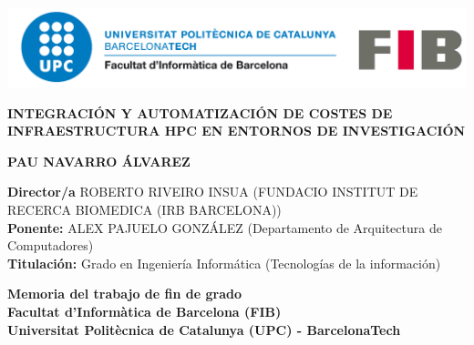 \begin{titlepage}
\begin{center}
    \includegraphics[width=1\linewidth]{extra/figures/logo-upc-fib.png}
    \vspace{30mm}

    \LARGE{\textsc{\textbf{{INTEGRACIÓN Y AUTOMATIZACIÓN DE COSTES DE INFRAESTRUCTURA HPC EN ENTORNOS DE INVESTIGACIÓN}}}} \\
    \vspace{25mm}
      
        
    \textbf{\Large{\textsc{PAU NAVARRO ÁLVAREZ}}} \\
    \vspace{25mm}
        
    
    
    \large{\textbf{Director/a} ROBERTO RIVEIRO INSUA (FUNDACIO INSTITUT DE RECERCA BIOMEDICA (IRB BARCELONA))} \\
    \large{\textbf{Ponente:} ALEX PAJUELO GONZÁLEZ (Departamento de Arquitectura de Computadores)} \\
    \large{\textbf{Titulación:} Grado en Ingeniería Informática (Tecnologías de la información)} \\
    \vspace{8mm}

    \textbf{\large{Memoria del trabajo de fin de grado}} \\
    \vspace{3mm}
    \textbf{\large{Facultat d'Informàtica de Barcelona (FIB)}} \\
    \vspace{3mm}
    \textbf{\large{Universitat Politècnica de Catalunya (UPC) - BarcelonaTech}} \\

\end{center}
\end{titlepage}